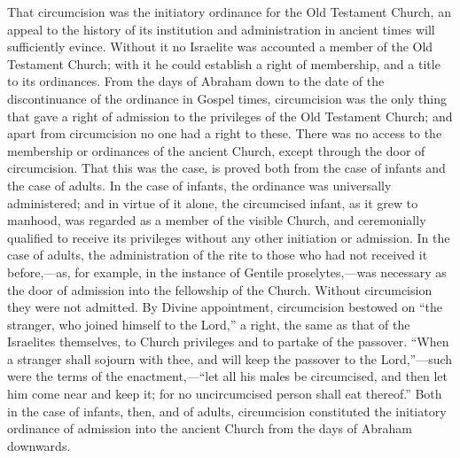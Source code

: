 \documentclass[]{book}
\begin{document}
That circumcision was the initiatory ordinance for the Old Testament Church, an appeal to the history of its institution and administration in ancient times will sufficiently evince. Without it no Israelite was accounted a member of the Old Testament Church; with it he could establish a right of membership, and a title to its ordinances. From the days of Abraham down to the date of the discontinuance of the ordinance in Gospel times, circumcision was the only thing that gave a right of admission to the privileges of the Old Testament Church; and apart from circumcision no one had a right to these. There was no access to the membership or ordinances of the ancient Church, except through the door of circumcision. That this was the case, is proved both from the case of infants and the case of adults. In the case of infants, the ordinance was universally administered; and in virtue of it alone, the circumcised infant, as it grew to manhood, was regarded as a member of the visible Church, and ceremonially qualified to receive its privileges without any other initiation or admission. In the case of adults, the administration of the rite to those who had not received it before,---as, for example, in the instance of Gentile proselytes,---was necessary as the door of admission into the fellowship of the Church. Without circumcision they were not admitted. By Divine appointment, circumcision bestowed on ``the stranger, who joined himself to the Lord,'' a right, the same as that of the Israelites themselves, to Church privileges and to partake of the passover. ``When a stranger shall sojourn with thee, and will keep the passover to the Lord,''---such were the terms of the enactment,---``let all his males be circumcised, and then let him come near and keep it; for no uncircumcised person shall eat thereof.'' Both in the case of infants, then, and of adults, circumcision constituted the initiatory ordinance of admission into the ancient Church from the days of Abraham downwards.
\end{document}

